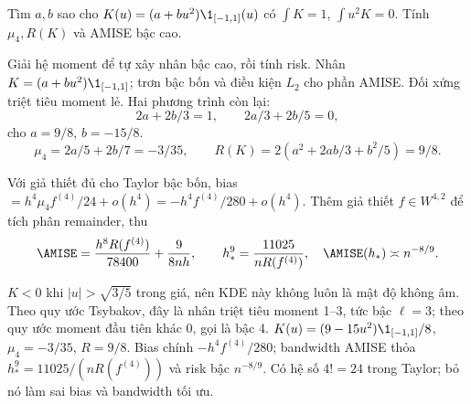 \begin{problem}\label{k:48}
Tìm $a,b$ sao cho $K(u)=(a+bu^2)\1_{[-1,1]}(u)$ có $\int K=1$, $\int u^2K=0$. Tính $\mu_4,R(K)$ và AMISE bậc cao.
\end{problem}
\begin{solution}
Giải hệ moment để tự xây nhân bậc cao, rồi tính risk.
Nhân $K=(a+bu^2)\1_{[-1,1]}$; trơn bậc bốn và điều kiện $L_2$ cho phần AMISE.
Đối xứng triệt tiêu moment lẻ. Hai phương trình còn lại:
\[
 2a+2b/3=1,\qquad2a/3+2b/5=0,
\]
cho $a=9/8$, $b=-15/8$.
\[
 \mu_4=2a/5+2b/7=-3/35,\qquad
 R(K)=2(a^2+2ab/3+b^2/5)=9/8.
\]

Với giả thiết đủ cho Taylor bậc bốn, bias $=h^4\mu_4f^{(4)}/24+o(h^4)=-h^4f^{(4)}/280+o(h^4)$.
Thêm giả thiết $f\in W^{4,2}$ để tích phân remainder, thu
\[
 \AMISE=\frac{h^8R(f^{(4)})}{78400}+\frac9{8nh},\qquad
 h_*^9=\frac{11025}{nR(f^{(4)})},\quad
 \AMISE(h_*)\asymp n^{-8/9}.
\]

$K<0$ khi $|u|>\sqrt{3/5}$ trong giá, nên KDE này không luôn là mật độ không âm. Theo quy ước Tsybakov, đây là nhân triệt tiêu moment 1--3, tức bậc $\ell=3$; theo quy ước moment đầu tiên khác 0, gọi là bậc 4.
$K(u)=(9-15u^2)\1_{[-1,1]}/8$, $\mu_4=-3/35$, $R=9/8$. Bias chính $-h^4f^{(4)}/280$; bandwidth AMISE thỏa $h_*^9=11025/(nR(f^{(4)}))$ và risk bậc $n^{-8/9}$.
Có hệ số $4!=24$ trong Taylor; bỏ nó làm sai bias và bandwidth tối ưu.
\end{solution}

